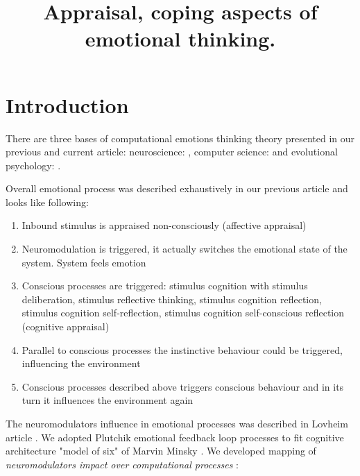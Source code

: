 \title{Appraisal, coping aspects of emotional thinking.}

\section{Introduction}

There are three bases of computational emotions thinking theory presented in our previous \cite{computational_emotional_thinking} and current article: neuroscience: \cite{emotionsbraintorobot, parsingreward, neuromodulatory, cubeofemotions, natureofemotions}, computer science: \cite{emotionandsociable, senticcomputing, hourglass, affectivemodelofinterplay, affectivecomputing, computationalmodelsemotion, computationalmodelsemotionscognition, evaluatingcomutationalmodel, threelevel} and evolutional psychology: \cite{natureofemotions, primer_affect_psychology, tomkins1, tomkins2, tomkins3, quest}.

Overall emotional process was described exhaustively in our previous article \cite{computational_emotional_thinking} and looks like following:

\begin{enumerate}
 \item  Inbound stimulus is appraised non-consciously (affective appraisal)
 \item  Neuromodulation is triggered, it actually switches the emotional state of the system. System feels emotion
 \item  Conscious processes are triggered: stimulus cognition with stimulus deliberation, stimulus reflective thinking, stimulus cognition reflection, stimulus cognition self-reflection, stimulus cognition self-conscious reflection (cognitive appraisal)
 \item  Parallel to conscious processes the instinctive behaviour could be triggered, influencing the environment
 \item  Conscious processes described above triggers conscious behaviour and in its turn it influences the environment again
\end{enumerate}

The neuromodulators influence in emotional processes was described in Lovheim article \cite{cubeofemotions}. We adopted Plutchik emotional feedback loop processes \cite{natureofemotions} to fit cognitive architecture "model of six" of Marvin Minsky \cite{emotionmachine}. We developed mapping of \emph{neuromodulators impact over computational processes} \cite{computational_emotional_thinking}:


